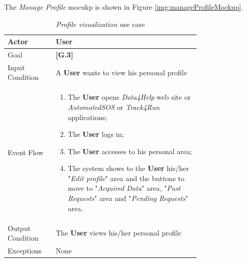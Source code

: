 The \textit{Manage Profile} mocukp is shown in Figure \ref{img:manageProfileMockup}.

\begin{center}
\begin{table}
\begin{tabular}{ | l | p{0.75\linewidth} | }
  \hline
    Actor & \textbf{User} \\ \hline
    Goal & \textbf{[G.3]} \\ \hline
    Input Condition & A \textbf{User} wants to view his personal profile\\ \hline
    Event Flow & \begin{minipage}[t]{0.7\textwidth}
      \begin{enumerate}
        \item The \textbf{User} opens \textit{Data4Help} web site or \textit{AutomatedSOS} or \textit{Track4Run} applications;
        \item The \textbf{User} logs in;
        \item The \textbf{User} accesses to his personal area;
        \item The system shows to the \textbf{User} his/her "\textit{Edit profile}" area and the buttons to move to "\textit{Acquired Data}" area, "\textit{Past Requests}" area and "\textit{Pending Requests}" area.
      \end{enumerate}
    \smallskip
  \end{minipage} \\ \hline
  Output Condition & The \textbf{User} views his/her personal profile\\ \hline
  Exceptions & None \\ \hline
\end{tabular}
\caption{\textit{Profile visualization} use case}
\label{table:profileVisualizationTable}
\end{table}
\end{center}

